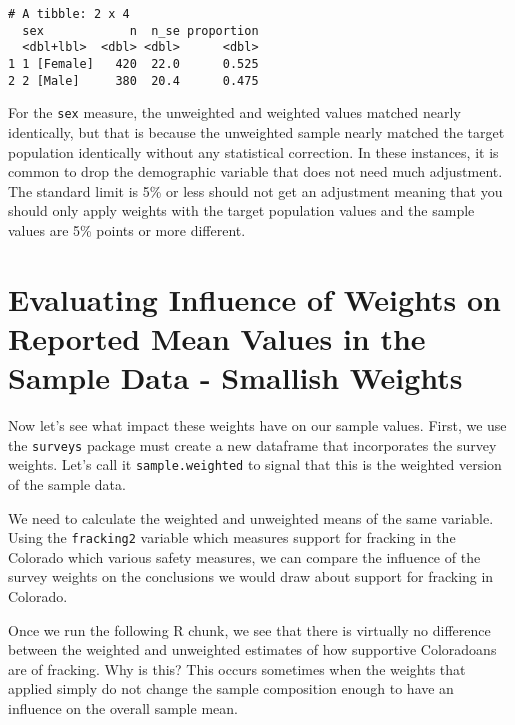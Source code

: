 \documentclass[
  letterpaper,
  DIV=11,
  numbers=noendperiod]{scrreprt}
\begin{document}
\begin{verbatim}
# A tibble: 2 x 4
  sex            n  n_se proportion
  <dbl+lbl>  <dbl> <dbl>      <dbl>
1 1 [Female]   420  22.0      0.525
2 2 [Male]     380  20.4      0.475
\end{verbatim}

For the \texttt{sex} measure, the unweighted and weighted values matched
nearly identically, but that is because the unweighted sample nearly
matched the target population identically without any statistical
correction. In these instances, it is common to drop the demographic
variable that does not need much adjustment. The standard limit is 5\%
or less should not get an adjustment meaning that you should only apply
weights with the target population values and the sample values are 5\%
points or more different.

\hypertarget{evaluating-influence-of-weights-on-reported-mean-values-in-the-sample-data---smallish-weights}{%
\section{Evaluating Influence of Weights on Reported Mean Values in the
Sample Data - Smallish
Weights}\label{evaluating-influence-of-weights-on-reported-mean-values-in-the-sample-data---smallish-weights}}

Now let's see what impact these weights have on our sample values.
First, we use the \texttt{surveys} package must create a new dataframe
that incorporates the survey weights. Let's call it
\texttt{sample.weighted} to signal that this is the weighted version of
the sample data.

We need to calculate the weighted and unweighted means of the same
variable. Using the \texttt{fracking2} variable which measures support
for fracking in the Colorado which various safety measures, we can
compare the influence of the survey weights on the conclusions we would
draw about support for fracking in Colorado.

Once we run the following R chunk, we see that there is virtually no
difference between the weighted and unweighted estimates of how
supportive Coloradoans are of fracking. Why is this? This occurs
sometimes when the weights that applied simply do not change the sample
composition enough to have an influence on the overall sample mean.
\end{document}
